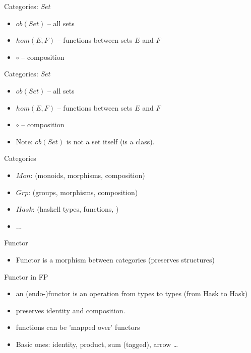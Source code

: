 \documentclass{beamer}
\begin{document}
\begin{frame}{Categories: $Set$}
\begin{itemize}
\item $ob(Set)$ -- all sets
\item $hom(E,F)$ -- functions between sets $E$ and $F$
\item $\circ$ -- composition
\end{itemize}

\end{frame}


\begin{frame}{Categories: $Set$}
\begin{itemize}
\item $ob(Set)$ -- all sets
\item $hom(E,F)$ -- functions between sets $E$ and $F$
\item $\circ$ -- composition
\item Note: $ob(Set)$ is not a set itself (is a class).
\end{itemize}

\end{frame}

\begin{frame}{Categories}
\begin{itemize}
\item $Mon$: (monoids, morphisms, composition)
\item $Grp$: (groups, morphisms, composition)
\item $Hask$: (haskell types, functions, )
\item ...
\end{itemize}

\end{frame}

\begin{frame}{Functor}
\begin{itemize}
\item Functor is a morphism between categories (preserves structures)
\end{itemize}

\end{frame}
\begin{frame}{Functor in FP}
\begin{itemize}
\item an (endo-)functor is an operation from types to types (from Hask to Hask)
\item preserves identity and composition.
\item functions can be 'mapped over' functors
\item Basic ones: identity, product, sum (tagged), arrow \dots

\end{itemize}

\end{frame}
\end{document}
